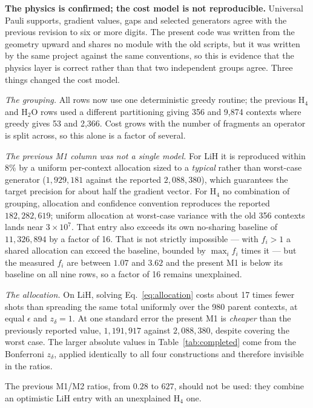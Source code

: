 \documentclass[10pt]{article}
\begin{document}
\textbf{The physics is confirmed; the cost model is not reproducible.} Universal
Pauli supports, gradient values, gaps and selected generators agree with the
previous revision to six or more digits. The present code was written from the
geometry upward and shares no module with the old scripts, but it was written by
the same project against the same conventions, so this is evidence that the
physics layer is correct rather than that two independent groups agree. Three
things changed the cost model.

\emph{The grouping.} All rows now use one deterministic greedy routine; the
previous H$_4$ and H$_2$O rows used a different partitioning giving 356 and 9,874
contexts where greedy gives 53 and 2,366. Cost grows with the number of fragments
an operator is split across, so this alone is a factor of several.

\emph{The previous M1 column was not a single model.} For LiH it is reproduced
within $8\%$ by a uniform per-context allocation sized to a \emph{typical} rather
than worst-case generator ($1{,}929{,}181$ against the reported $2{,}088{,}380$),
which guarantees the target precision for about half the gradient vector. For
H$_4$ no combination of grouping, allocation and confidence convention reproduces
the reported $182{,}282{,}619$; uniform allocation at worst-case variance with the
old 356 contexts lands near $3\times10^7$. That entry also exceeds its own
no-sharing baseline of $11{,}326{,}894$ by a factor of 16. That is not strictly
impossible --- with $f_i>1$ a shared allocation can exceed the baseline, bounded
by $\max_i f_i$ times it --- but the measured $f_i$ are between $1.07$ and $3.62$
and the present M1 is below its baseline on all nine rows, so a factor of 16
remains unexplained.

\emph{The allocation.} On LiH, solving Eq.~\eqref{eq:allocation} costs about 17
times fewer shots than spreading the same total uniformly over the 980 parent
contexts, at equal $\epsilon$ and $z_\delta=1$. At one standard error the present
M1 is \emph{cheaper} than the previously reported value, $1{,}191{,}917$ against
$2{,}088{,}380$, despite covering the worst case. The larger absolute values in
Table~\ref{tab:completed} come from the Bonferroni $z_\delta$, applied identically
to all four constructions and therefore invisible in the ratios.

The previous M1/M2 ratios, from $0.28$ to $627$, should not be used: they combine
an optimistic LiH entry with an unexplained H$_4$ one.
\end{document}
